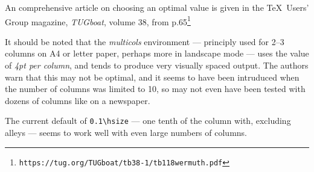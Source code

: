 \documentclass[a4paper,DIV=11]{scrartcl}
\begin{document}
\begin{multicols}{2}
{  An comprehensive article on choosing an optimal value is given in the
  \TeX\ Users' Group magazine, \textit{TUGboat}, volume 38, from p.65\footnote{
  \texttt{https://tug.org/TUGboat/tb38-1/tb118wermuth.pdf}} \par
  It should be noted that the \textit{multicols} environment ---
  principly used for 2--3 columns on A4 or letter paper, perhaps more
  in landscape mode --- uses the value of \textit{4pt per column}, and
  tends to produce very visually spaced output. The authors warn that
  this may not be optimal, and it seems to have been intruduced when
  the number of columns was limited to 10, so may not even have been
  tested with dozens of columns like on a newspaper.
  \par
  The current default of \texttt{0.1\textbackslash hsize} --- one
  tenth of the column with, excluding alleys --- seems to
  work well with even large numbers of columns.
}
\end{multicols}
\end{document}
